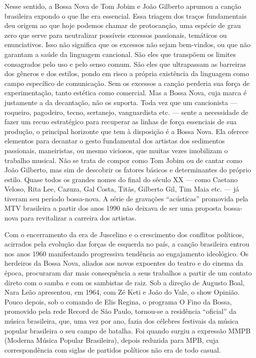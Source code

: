 Nesse sentido, a Bossa Nova de Tom Jobim e João Gilberto aprumou a
canção brasileira expondo o que lhe era essencial. Essa triagem dos
traços fundamentais deu origem ao que hoje podemos chamar de
protocanção, uma espécie de grau zero que serve para neutralizar
possíveis excessos passionais, temáticos ou enunciativos. Isso não
significa que os excessos não sejam bem-vindos, ou que não garantam a
saúde da linguagem cancional. São eles que transpõem os limites
consagrados pelo uso e pelo senso comum. São eles que ultrapassam as
barreiras dos gêneros e dos estilos, pondo em risco a própria existência
da linguagem como campo específico de comunicação. Sem os excessos a
canção perderia sua força de experimentação, tanto estética como
comercial. Mas a Bossa Nova, cuja marca é justamente a da decantação,
não os suporta. Toda vez que um cancionista --- roqueiro, pagodeiro,
tecno, sertanejo, vanguardista etc. --- sente a necessidade de fazer um
recuo estratégico para recuperar as linhas de força essenciais de sua
produção, o principal horizonte que tem à disposição é a Bossa Nova. Ela
oferece elementos para decantar o gesto fundamental dos artistas dos
sedimentos passionais, maneiristas, ou mesmo viciosos, que muitas vezes
imobilizam o trabalho musical. Não se trata de compor como Tom Jobim ou
de cantar como João Gilberto, mas sim de descobrir os fatores básicos e
determinantes do próprio estilo. Quase todos os grandes nomes do final
do século XX --- como Caetano Veloso, Rita Lee, Cazuza, Gal Costa,
Titãs, Gilberto Gil, Tim Maia etc. --- já tiveram seu período
bossa-nova. A série de gravações ``acústicas'' promovida pela MTV
brasileira a partir dos anos 1990 não deixava de ser uma proposta
bossa-nova para revitalizar a carreira dos artistas.

Com o encerramento da era de Juscelino e o crescimento dos conflitos
políticos, acirrados pela evolução das forças de esquerda no país, a
canção brasileira entrou nos anos 1960 manifestando progressiva
tendência ao engajamento ideológico. Os herdeiros da Bossa Nova, aliados
aos novos expoentes do teatro e do cinema da época, procuraram dar mais
consequência a seus trabalhos a partir de um contato direto com o samba
e com os sambistas de raiz. Sob a direção de Augusto Boal, Nara Leão
apresentou, em 1964, com Zé Keti e João do Vale, o show Opinião. Pouco
depois, sob o comando de Elis Regina, o programa O Fino da Bossa,
promovido pela rede Record de São Paulo, tornou-se a residência
``oficial'' da música brasileira, que, uma vez por ano, fazia dos
célebres festivais da música popular brasileira o seu campo de batalha.
Foi quando surgiu a expressão MMPB (Moderna Música Popular Brasileira),
depois reduzida para MPB, cuja correspondência com siglas de partidos
políticos não era de todo casual.


